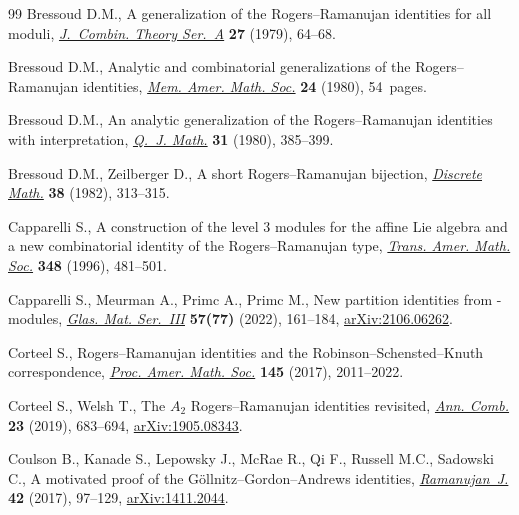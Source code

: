 \documentclass[10pt,a4paper]{amsart}
\numberwithin{equation}{section}
\theoremstyle{definition}
\begin{document}
\begin{thebibliography}{99}
Bressoud D.M., A generalization of the {R}ogers--{R}amanujan identities for all
 moduli,
 \href{https://doi.org/10.1016/0097-3165(79)90008-6}{\textit{J.~Combin. Theory
 Ser.~A}} \textbf{27} (1979), 64--68.

Bressoud D.M., Analytic and combinatorial generalizations of the
 {R}ogers--{R}amanujan identities,
 \href{https://doi.org/10.1090/memo/0227}{\textit{Mem. Amer. Math. Soc.}}
 \textbf{24} (1980), 54~pages.

Bressoud D.M., An analytic generalization of the {R}ogers--{R}amanujan
 identities with interpretation,
 \href{https://doi.org/10.1093/qmath/31.4.385}{\textit{Q.~J. Math.}}
 \textbf{31} (1980), 385--399.

Bressoud D.M., Zeilberger D., A short {R}ogers--{R}amanujan bijection,
 \href{https://doi.org/10.1016/0012-365X(82)90298-9}{\textit{Discrete Math.}}
 \textbf{38} (1982), 313--315.

Capparelli S., A construction of the level {$3$} modules for the affine {L}ie
 algebra  and a new combinatorial identity of the
 {R}ogers--{R}amanujan type,
 \href{https://doi.org/10.1090/S0002-9947-96-01535-8}{\textit{Trans. Amer.
 Math. Soc.}} \textbf{348} (1996), 481--501.

Capparelli S., Meurman A., Primc A., Primc M., New partition identities from
 -modules,
 \href{https://doi.org/10.3336/gm.57.2.01}{\textit{Glas. Mat. Ser.~III}}
 \textbf{57(77)} (2022), 161--184,
 \href{http://arxiv.org/abs/2106.06262}{arXiv:2106.06262}.

Corteel S., Rogers--{R}amanujan identities and the
 {R}obinson--{S}chensted--{K}nuth correspondence,
 \href{https://doi.org/10.1090/proc/13373}{\textit{Proc. Amer. Math. Soc.}}
 \textbf{145} (2017), 2011--2022.

Corteel S., Welsh T., The {$A_2$} {R}ogers--{R}amanujan identities revisited,
 \href{https://doi.org/10.1007/s00026-019-00446-7}{\textit{Ann. Comb.}}
 \textbf{23} (2019), 683--694,
 \href{http://arxiv.org/abs/1905.08343}{arXiv:1905.08343}.

Coulson B., Kanade S., Lepowsky J., McRae R., Qi F., Russell M.C., Sadowski C.,
 A motivated proof of the {G}\"{o}llnitz--{G}ordon--{A}ndrews identities,
 \href{https://doi.org/10.1007/s11139-015-9722-8}{\textit{Ramanujan~J.}}
 \textbf{42} (2017), 97--129,
 \href{http://arxiv.org/abs/1411.2044}{arXiv:1411.2044}.


\end{thebibliography}
\end{document}
